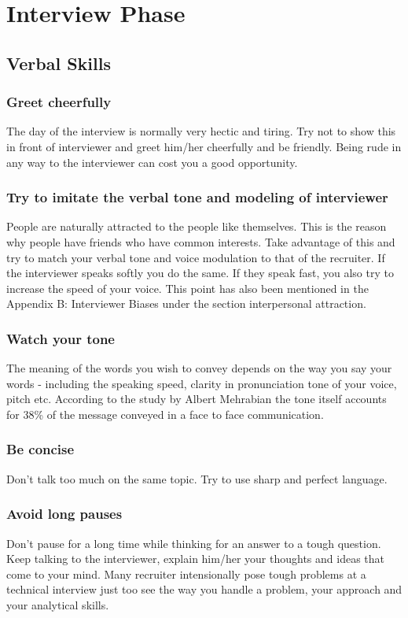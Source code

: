 \documentclass[a4paper,12pt]{report}
\begin{document}
\section{Interview Phase}

\subsection{Verbal Skills}
\subsubsection{Greet cheerfully}
The day of the interview is normally very hectic and tiring. Try not to show this in front of interviewer and
greet him/her cheerfully and be friendly. Being rude in any way to the interviewer can cost you a good opportunity.
\subsubsection{Try to imitate the verbal tone and modeling of interviewer}
People are naturally attracted to the people like themselves. This is the reason why people have friends who
have common interests. Take advantage of this and try to match your verbal tone and voice modulation to that
of the recruiter. If the interviewer speaks softly you do the same. If they speak fast, you also try to increase 
the speed of your voice. This point has also been mentioned in the Appendix B: Interviewer Biases under the section
interpersonal attraction.
\subsubsection{Watch your tone}
The meaning of the words you wish to convey depends on the way you say your words - including the speaking
 speed, clarity in pronunciation tone of your voice, pitch etc. According to the study by Albert Mehrabian
\cite{mehrabian} the tone itself accounts for 38\% of the message conveyed in a face to face communication.
\subsubsection{Be concise}
Don't talk too much on the same topic. Try to use sharp and perfect language. 
\subsubsection{Avoid long pauses}
Don't pause for a long time while thinking for an answer to a tough question. Keep talking to the interviewer, explain him/her your
thoughts and ideas that come to your mind. Many recruiter intensionally pose tough problems at a technical interview just too
see the way you handle a problem, your approach and your analytical skills.
\end{document}
